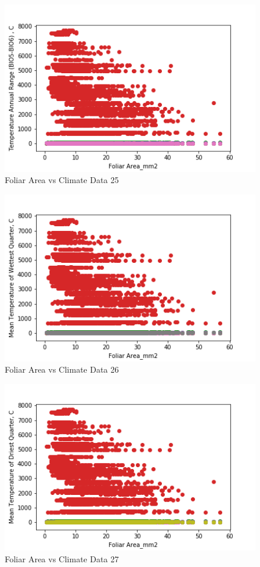 \documentclass[letterpaper]{article}
\begin{document}
\begin{figure}[h]
\caption{Foliar Area vs Climate Data 25\label{fig:Foliar_Area_vs_25}}
\centering
\includegraphics[width=0.7\paperwidth]{Foliar_Area_vs_25}
\end{figure}


\begin{figure}[h]
\caption{Foliar Area vs Climate Data 26\label{fig:Foliar_Area_vs_26}}
\centering
\includegraphics[width=0.7\paperwidth]{Foliar_Area_vs_26}
\end{figure}


\begin{figure}[h]
\caption{Foliar Area vs Climate Data 27\label{fig:Foliar_Area_vs_27}}
\centering
\includegraphics[width=0.7\paperwidth]{Foliar_Area_vs_27}
\end{figure}
\end{document}
